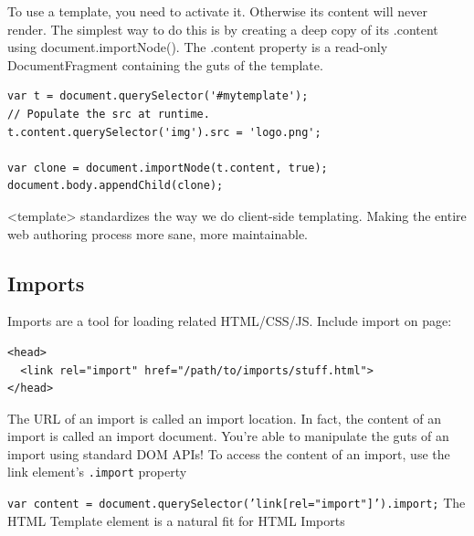 \documentclass[11pt]{article}
\begin{document}
To use a template, you need to activate it. Otherwise its content will never render. The simplest way to do this is by creating a deep copy of its .content using document.importNode(). The .content property is a read-only DocumentFragment containing the guts of the template.

\lstset{breaklines=true,language=js,label= ,caption= ,captionpos=b,numbers=none}
\begin{lstlisting}
var t = document.querySelector('#mytemplate');
// Populate the src at runtime.
t.content.querySelector('img').src = 'logo.png';

var clone = document.importNode(t.content, true);
document.body.appendChild(clone);
\end{lstlisting}
<template> standardizes the way we do client-side templating. Making the entire web authoring process more sane, more maintainable.
\subsection{Imports}
\label{sec:orga8c0c53}
Imports are a tool for loading related HTML/CSS/JS.
Include import on page:
\lstset{breaklines=true,language=HTML,label= ,caption= ,captionpos=b,numbers=none}
\begin{lstlisting}
<head>
  <link rel="import" href="/path/to/imports/stuff.html">
</head>
\end{lstlisting}
The URL of an import is called an import location.
In fact, the content of an import is called an import document. You're able to manipulate the guts of an import using standard DOM APIs!
To access the content of an import, use the link element's \texttt{.import} property

\texttt{var content = document.querySelector('link[rel="import"]').import;}
The HTML Template element is a natural fit for HTML Imports
\end{document}
